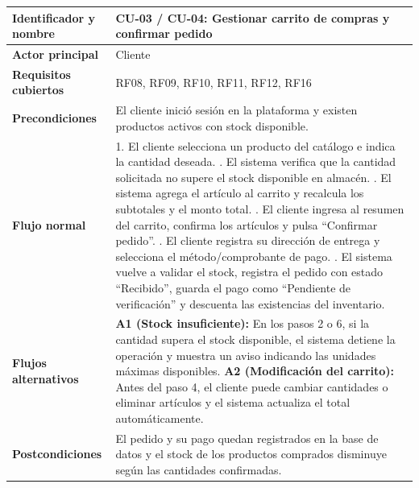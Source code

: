 {\begin{xltabular}{\textwidth}{|>{\raggedright\arraybackslash}p{3.4cm}|X|}
    \textbf{Identificador y nombre} & CU-03 / CU-04: Gestionar carrito de compras y confirmar pedido \\*
    \hline
    \textbf{Actor principal} & Cliente \\*
    \hline
    \textbf{Requisitos cubiertos} & RF08, RF09, RF10, RF11, RF12, RF16 \\*
    \hline
    \textbf{Precondiciones} & El cliente inició sesión en la plataforma y existen productos activos con stock disponible. \\*
    \hline
    \textbf{Flujo normal} & 
    1. El cliente selecciona un producto del catálogo e indica la cantidad deseada. . El sistema verifica que la cantidad solicitada no supere el stock disponible en almacén. . El sistema agrega el artículo al carrito y recalcula los subtotales y el monto total. . El cliente ingresa al resumen del carrito, confirma los artículos y pulsa ``Confirmar pedido''. . El cliente registra su dirección de entrega y selecciona el método/comprobante de pago. . El sistema vuelve a validar el stock, registra el pedido con estado ``Recibido'', guarda el pago como ``Pendiente de verificación'' y descuenta las existencias del inventario. \\*
    \hline
    \textbf{Flujos alternativos} & \textbf{A1 (Stock insuficiente):} En los pasos 2 o 6, si la cantidad supera el stock disponible, el sistema detiene la operación y muestra un aviso indicando las unidades máximas disponibles. \newline
    \textbf{A2 (Modificación del carrito):} Antes del paso 4, el cliente puede cambiar cantidades o eliminar artículos y el sistema actualiza el total automáticamente. \\*
    \hline
    \textbf{Postcondiciones} & El pedido y su pago quedan registrados en la base de datos y el stock de los productos comprados disminuye según las cantidades confirmadas. \\
    \hline
\end{xltabular}
}


